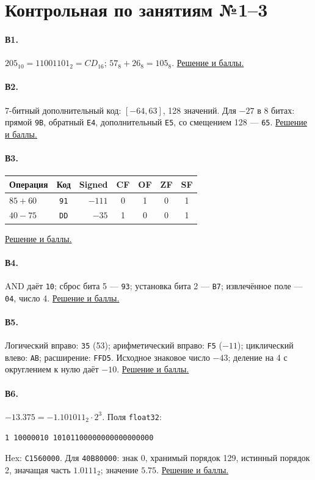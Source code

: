 \section{Контрольная по занятиям №1--3}\label{answers:mock13}
\paragraph*{В1.}\label{ans:v1}
$205_{10}=11001101_2=CD_{16}$; $57_8+26_8=105_8$.
\hyperref[sol:v1]{Решение и баллы.}

\paragraph*{В2.}\label{ans:v2}
7-битный дополнительный код: $[-64,63]$, 128 значений. Для $-27$ в 8 битах: прямой \texttt{9B}, обратный \texttt{E4}, дополнительный \texttt{E5}, со смещением 128 --- \texttt{65}.
\hyperref[sol:v2]{Решение и баллы.}

\paragraph*{В3.}\label{ans:v3}
\begin{center}
\begin{tabular}{l|c|r|cccc}
Операция & Код & Signed & CF & OF & ZF & SF\\\hline
$85+60$ & \texttt{91} & $-111$ & 0 & 1 & 0 & 1\\
$40-75$ & \texttt{DD} & $-35$ & 1 & 0 & 0 & 1
\end{tabular}
\end{center}
\hyperref[sol:v3]{Решение и баллы.}

\paragraph*{В4.}\label{ans:v4}
AND даёт \texttt{10}; сброс бита 5 --- \texttt{93}; установка бита 2 --- \texttt{B7}; извлечённое поле --- \texttt{04}, число 4.
\hyperref[sol:v4]{Решение и баллы.}

\paragraph*{В5.}\label{ans:v5}
Логический вправо: \texttt{35} (53); арифметический вправо: \texttt{F5} ($-11$); циклический влево: \texttt{AB}; расширение: \texttt{FFD5}. Исходное знаковое число $-43$; деление на 4 с округлением к нулю даёт $-10$.
\hyperref[sol:v5]{Решение и баллы.}

\paragraph*{В6.}\label{ans:v6}
$-13.375=-1.101011_2\cdot2^3$. Поля \texttt{float32}:
\begin{center}
\texttt{1 10000010 10101100000000000000000}
\end{center}
Hex: \texttt{C1560000}. Для \texttt{40B80000}: знак 0, хранимый порядок 129, истинный порядок 2, значащая часть $1.0111_2$; значение $5.75$.
\hyperref[sol:v6]{Решение и баллы.}

